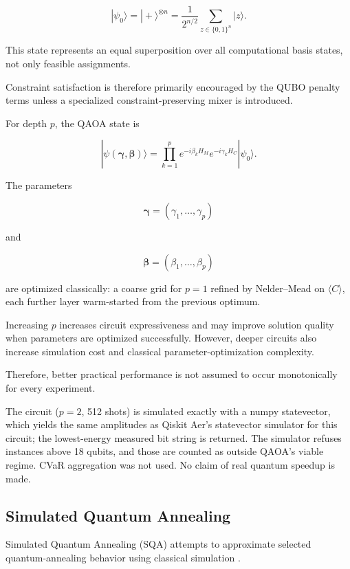 \documentclass[12pt, a4paper]{article}
\begin{document}
$$
|\psi_0\rangle
=
|+\rangle^{\otimes n}
=
\frac{1}{2^{n/2}}
\sum_{z\in\{0,1\}^{n}}
|z\rangle.
$$

This state represents an equal superposition over all computational basis states, not only feasible assignments.

Constraint satisfaction is therefore primarily encouraged by the QUBO penalty terms unless a specialized constraint-preserving mixer is introduced.

For depth $p$, the QAOA state is

$$
|\psi(\boldsymbol{\gamma},\boldsymbol{\beta})\rangle
=
\prod_{k=1}^{p}
e^{-i\beta_k H_M}
e^{-i\gamma_k H_C}
|\psi_0\rangle.
$$

The parameters

$$
\boldsymbol{\gamma}
=
(\gamma_1,\ldots,\gamma_p)
$$

and

$$
\boldsymbol{\beta}
=
(\beta_1,\ldots,\beta_p)
$$

are optimized classically: a coarse grid for $p=1$ refined by Nelder--Mead on $\langle C\rangle$, each further layer warm-started from the previous optimum.

Increasing $p$ increases circuit expressiveness and may improve solution quality when parameters are optimized successfully. However, deeper circuits also increase simulation cost and classical parameter-optimization complexity.

Therefore, better practical performance is not assumed to occur monotonically for every experiment.

The circuit ($p = 2$, 512 shots) is simulated exactly with a numpy statevector, which yields the same amplitudes as Qiskit Aer's statevector simulator \cite{QiskitAlgorithms} for this circuit; the lowest-energy measured bit string is returned. The simulator refuses instances above 18 qubits, and those are counted as outside QAOA's viable regime. CVaR aggregation \cite{Barkoutsos2020} was not used. No claim of real quantum speedup is made.

\subsection*{Simulated Quantum Annealing}

Simulated Quantum Annealing (SQA) attempts to approximate selected quantum-annealing behavior using classical simulation \cite{Martonak2002}.
\end{document}
